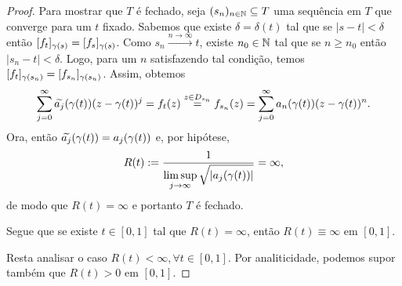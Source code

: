 \begin{proof}
        Para mostrar que $T$ é fechado, seja $(s_n)_{n\in\mathbb{N}}\subseteq T$ uma
        sequência em $T$ que converge para um $t$ fixado. Sabemos que existe 
        $\delta = \delta(t)$ tal que se $|s-t|<\delta$ então 
        $[f_t]_{\gamma(s)} = [f_s]_{\gamma(s)}$. Como $s_n\xrightarrow{n\to\infty} t$,
        existe $n_0\in\mathbb{N}$ tal que se $n\geq n_0$ então $|s_n - t|<\delta$.
        Logo, para um $n$ satisfazendo tal condição, temos
        $[f_t]_{\gamma(s_n)} = [f_{s_n}]_{\gamma(s_n)}$. Assim, obtemos 
        \begin{align*}
            \sum_{j=0}^\infty \widetilde{a_j}(\gamma(t))(z-\gamma(t))^j
            =
            f_t(z)
            \stackrel{z\in D_{s_n}}{=}
            f_{s_n}(z)
            =
            \sum_{j=0}^\infty a_n(\gamma(t))(z-\gamma(t))^n.
        \end{align*}
        Ora, então $\widetilde{a_j}(\gamma(t)) = a_j(\gamma(t))$ e, por hipótese,
        \begin{equation*}
            R(t) := \frac{1}{\displaystyle\limsup_{j\to\infty} \sqrt{|a_j(\gamma(t))|} } 
            = \infty,
        \end{equation*}
        de modo que $R(t) = \infty$ e portanto $T$ é fechado.
        
        Segue que se existe $t\in [0,1]$ tal que $R(t) = \infty$, então
        $R(t) \equiv\infty$ em $[0,1]$.
        
        Resta analisar o caso $R(t) < \infty, \forall t\in[0,1]$. Por analiticidade, podemos
        supor também que $R(t) > 0$ em $[0,1]$.
        

\end{proof}
